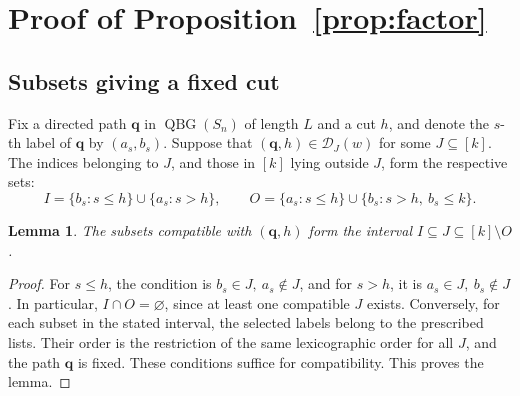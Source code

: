 \documentclass[11pt,a4paper,reqno]{amsart}
\DeclareRobustCommand{\rev}[1]{{\color{revision}#1}}
\numberwithin{equation}{section}
\newtheorem{lemma}[theorem]{Lemma}
\theoremstyle{definition}
\DeclareMathOperator{\QBG}{QBG}
\newcommand{\qq}{\mathbf q}
\begin{document}
\section{Proof of Proposition~\ref{prop:factor}}\label{sec:factor}
\subsection{Subsets giving a fixed cut}
\rev{Fix a directed path \(\qq\) in \(\QBG(S_n)\) of length \(L\) and a cut \(h\), and denote the \(s\)-th label of \(\qq\) by \((a_s,b_s)\). Suppose that \((\qq,h)\in\mathcal D_J(w)\) for some \(J\subseteq[k]\). The indices belonging to \(J\), and those in \([k]\) lying outside \(J\), form the respective sets:}
\[
 I=\{b_s:s\le h\}\cup\{a_s:s>h\},\qquad
 O=\{a_s:s\le h\}\cup\{b_s:s>h,\ b_s\le k\}.
\]
\begin{lemma}\label{lem:interval}
The subsets compatible with \((\qq,h)\) form the interval
\(I\subseteq J\subseteq[k]\setminus O\).
\end{lemma}
\begin{proof}
\rev{For \(s\le h\), the condition is \(b_s\in J,\ a_s\notin J\), and for \(s>h\), it is \(a_s\in J,\ b_s\notin J\). In particular, \(I\cap O=\varnothing\), since at least one compatible \(J\) exists. Conversely, for each subset in the stated interval, the selected labels belong to the prescribed lists. Their order is the restriction of the same lexicographic order for all \(J\), and the path \(\qq\) is fixed. These conditions suffice for compatibility. This proves the lemma.}
\end{proof}
\end{document}
